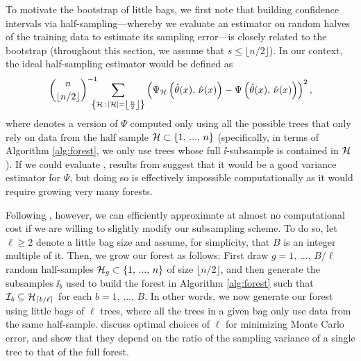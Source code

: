 \documentclass[aos]{imsart}
\theoremstyle{plain}
\theoremstyle{definition}
\theoremstyle{remark}
\begin{document}
\begin{CJK}{UTF8}{gbsn}
To motivate the bootstrap of little bags, we first note that
building confidence intervals via half-sampling---whereby we evaluate an estimator on random
halves of the training data to estimate its sampling error---is closely related to the
bootstrap \citep{efron1982jackknife} (throughout this section, we assume that $s \leq \lfloor n/2 \rfloor$).
In our context, the ideal half-sampling estimator would be  defined as
\begin{equation}
\label{eq:hs_opt}
\binom{n}{\lfloor n/2 \rfloor}^{-1}
\!\!\!\!\!
\sum_{\cb{\hh \, : \, \abs{\hh} = \left\lfloor \frac{n}{2} \right\rfloor}}
\p{\Psi_{\hh}\p{\htheta(x), \, \hnu(x)} - \Psi\p{\htheta(x), \, \hnu(x)}}^2,
\end{equation}
where \smash{$\Psi_{\hh}$} denotes a version of $\Psi$ computed only using all the possible
trees that only rely on data from the half sample $\mathcal{H} \subset \left\{1, \, ..., \, n\right\}$ (specifically, in terms of Algorithm
\ref{alg:forest}, we only use trees whose full $\ii$-subsample is contained in $\mathcal{H}$).
If we could evaluate , results from \citet{efron1982jackknife}
suggest that it would be a good variance estimator for $\Psi$, but doing so is
effectively impossible computationally as it would require growing very many forests.

Following \citet{sexton2009standard}, however, we can efficiently approximate 
at almost no computational cost if we are willing to slightly modify our subsampling scheme.
To do so, let $\ell \geq 2$ denote a little bag size and assume, for simplicity, that $B$ is an integer
multiple of it.
Then, we grow our forest as follows: First draw $g = 1, \, ..., \, B/\ell$ random half-samples
$\mathcal{H}_g \subset \left\{1, \, ..., \, n\right\}$ of size $\lfloor n/2 \rfloor$, and then generate the subsamples
$\ii_b$ used to build the forest in Algorithm \ref{alg:forest} such that $\mathcal{I}_b \subseteq \mathcal{H}_{\lceil b/\ell \rceil}$
for each $b = 1, \, ..., \, B$. In other words, we now generate our forest using little bags of
$\ell$ trees, where all the trees in a given bag only use data from the same half-sample.
\citet{sexton2009standard} discuss optimal choices of $\ell$ for minimizing Monte Carlo error,
and show that they depend on the ratio of the sampling variance of a single tree to that of the full forest.


\end{CJK}
\end{document}
